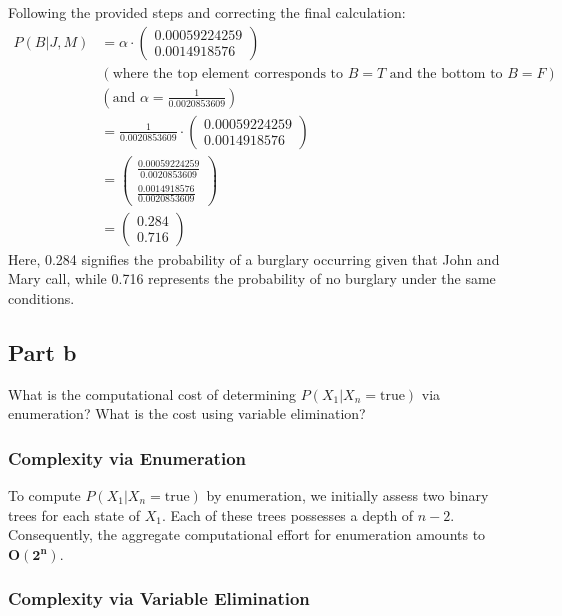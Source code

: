 \documentclass[12pt]{article}
\begin{document}
Following the provided steps and correcting the final calculation:
\begin{align*}
P(B|J,M)
& = \alpha \cdot \begin{pmatrix} 0.00059224259 \\ 0.0014918576 \end{pmatrix} \\
& \left( \text{where the top element corresponds to } B=T \text{ and the bottom to } B=F \right) \\
& \left( \text{and } \alpha = \frac{1}{0.0020853609} \right) \\
& = \frac{1}{0.0020853609} \cdot \begin{pmatrix} 0.00059224259 \\ 0.0014918576 \end{pmatrix} \\
& = \begin{pmatrix} \frac{0.00059224259}{0.0020853609} \\ \frac{0.0014918576}{0.0020853609} \end{pmatrix} \\
& = \begin{pmatrix} 0.284 \\ 0.716 \end{pmatrix}
\end{align*}
Here, 0.284 signifies the probability of a burglary occurring given that John and Mary call, while 0.716 represents the probability of no burglary under the same conditions.

\newpage

\subsection*{Part b}

What is the computational cost of determining $P(X_1 | X_n = \text{true})$ via enumeration? What is the cost using variable elimination?

\subsubsection*{Complexity via Enumeration}

To compute $P(X_1 | X_n = \text{true})$ by enumeration, we initially assess two binary trees for each state of $X_1$. Each of these trees possesses a depth of $n - 2$. Consequently, the aggregate computational effort for enumeration amounts to $\mathbf{O(2^n)}$.

\subsubsection*{Complexity via Variable Elimination}
\end{document}
